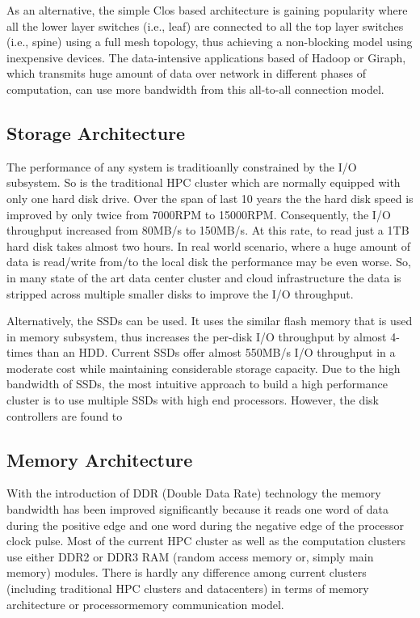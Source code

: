 \documentclass[journal]{IEEEtran}
\begin{document}
As an alternative, the simple Clos based architecture is gaining popularity where all the lower layer switches (i.e., leaf) are connected to all the top layer switches (i.e., spine) using a full mesh topology, thus achieving a non-blocking model using inexpensive devices. The data-intensive applications based of Hadoop or Giraph, which transmits huge amount of data over network in different phases of computation, can use more bandwidth from this all-to-all connection model.

\subsection{Storage Architecture}
The performance of any system is traditioanlly constrained by the I/O subsystem. So is the traditional HPC cluster which are normally equipped with only one hard disk drive. Over the span of last 10 years the the hard disk speed is improved by only twice from 7000RPM to 15000RPM. Consequently, the I/O throughput increased from 80MB/s to 150MB/s. At this rate, to read just a 1TB hard disk takes almost two hours. In real world scenario, where a huge amount of data is read/write from/to the local disk the performance may be even worse. So, in many state of the art data center cluster and cloud infrastructure the data is stripped across multiple smaller disks to improve the I/O throughput.

Alternatively, the SSDs can be used. It uses the similar flash memory that is used in memory subsystem, thus increases the per-disk I/O throughput by almost 4-times than an HDD. Current SSDs offer almost 550MB/s I/O throughput in a moderate cost while maintaining considerable storage capacity. Due to the high bandwidth of SSDs, the most intuitive approach to build a high performance cluster is to use multiple SSDs with high end processors. However, the disk controllers are found to

\subsection{Memory Architecture}
With the introduction of DDR (Double Data Rate) technology the memory bandwidth has been improved significantly because it reads one word of data during the positive edge and one word during the negative edge of the processor clock pulse. Most of the current HPC cluster as well as the computation clusters use either DDR2 or DDR3 RAM (random access memory or, simply main memory) modules. There is hardly any difference among current clusters (including traditional HPC clusters and datacenters) in terms of memory architecture or processormemory communication model. 
\end{document}
